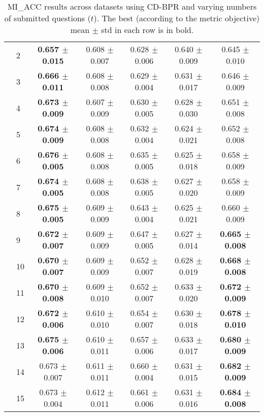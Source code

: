 \begin{table*}[t]
{\begin{tabular}{ll c c c c c}
        & 2 & \textbf{0.657 $\pm$ 0.015} & 0.608 $\pm$ 0.007 & 0.628 $\pm$ 0.006 & 0.640 $\pm$ 0.009 & 0.645 $\pm$ 0.010 \\
        & 3 & \textbf{0.666 $\pm$ 0.011} & 0.608 $\pm$ 0.008 & 0.629 $\pm$ 0.004 & 0.631 $\pm$ 0.017 & 0.646 $\pm$ 0.009 \\
        & 4 & \textbf{0.673 $\pm$ 0.009} & 0.607 $\pm$ 0.009 & 0.630 $\pm$ 0.005 & 0.628 $\pm$ 0.030 & 0.651 $\pm$ 0.008 \\
        & 5 & \textbf{0.674 $\pm$ 0.009} & 0.608 $\pm$ 0.008 & 0.632 $\pm$ 0.004 & 0.624 $\pm$ 0.021 & 0.652 $\pm$ 0.008 \\
        & 6 & \textbf{0.676 $\pm$ 0.005} & 0.608 $\pm$ 0.008 & 0.635 $\pm$ 0.005 & 0.625 $\pm$ 0.018 & 0.658 $\pm$ 0.009 \\
        & 7 & \textbf{0.674 $\pm$ 0.005} & 0.608 $\pm$ 0.008 & 0.638 $\pm$ 0.005 & 0.627 $\pm$ 0.020 & 0.658 $\pm$ 0.009 \\
        & 8 & \textbf{0.675 $\pm$ 0.005} & 0.609 $\pm$ 0.009 & 0.643 $\pm$ 0.004 & 0.625 $\pm$ 0.021 & 0.660 $\pm$ 0.009 \\
        & 9 & \textbf{0.672 $\pm$ 0.007} & 0.609 $\pm$ 0.009 & 0.647 $\pm$ 0.005 & 0.627 $\pm$ 0.014 & \textbf{0.665 $\pm$ 0.008} \\
        & 10 & \textbf{0.670 $\pm$ 0.007} & 0.609 $\pm$ 0.009 & 0.652 $\pm$ 0.007 & 0.628 $\pm$ 0.019 & \textbf{0.668 $\pm$ 0.008} \\
        & 11 & \textbf{0.670 $\pm$ 0.008} & 0.609 $\pm$ 0.010 & 0.652 $\pm$ 0.007 & 0.633 $\pm$ 0.020 & \textbf{0.672 $\pm$ 0.009} \\
        & 12 & \textbf{0.672 $\pm$ 0.006} & 0.610 $\pm$ 0.010 & 0.654 $\pm$ 0.007 & 0.630 $\pm$ 0.018 & \textbf{0.678 $\pm$ 0.010} \\
        & 13 & \textbf{0.675 $\pm$ 0.006} & 0.610 $\pm$ 0.011 & 0.657 $\pm$ 0.006 & 0.633 $\pm$ 0.017 & \textbf{0.680 $\pm$ 0.009} \\
        & 14 & 0.673 $\pm$ 0.007 & 0.611 $\pm$ 0.011 & 0.660 $\pm$ 0.004 & 0.631 $\pm$ 0.015 & \textbf{0.682 $\pm$ 0.009} \\
        & 15 & 0.673 $\pm$ 0.004 & 0.612 $\pm$ 0.011 & 0.661 $\pm$ 0.006 & 0.631 $\pm$ 0.016 & \textbf{0.684 $\pm$ 0.008} \\
\bottomrule
\end{tabular}
}
\caption{MI_ACC results across datasets using CD-BPR and varying numbers of submitted questions ($t$). The best (according to the metric objective) mean $\pm$ std in each row is in bold.}
\label{tab:results-mi_acc-cd-bpr}
\end{table*}

